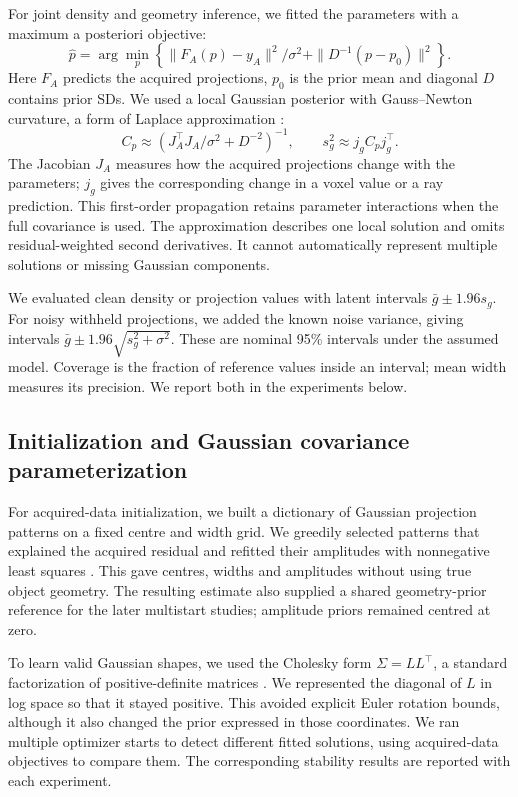 \documentclass[11pt,a4paper]{article}
\begin{document}
For joint density and geometry inference, we fitted the parameters with a maximum a posteriori objective:
\begin{equation}
\hat p=\arg\min_p\left\{\|F_A(p)-y_A\|^2/\sigma^2+\|D^{-1}(p-p_0)\|^2\right\}.
\end{equation}
Here $F_A$ predicts the acquired projections, $p_0$ is the prior mean and diagonal $D$ contains prior SDs. We used a local Gaussian posterior with Gauss--Newton curvature, a form of Laplace approximation \cite{laplace}:
\begin{equation}
C_p\approx\left(J_A^\top J_A/\sigma^2+D^{-2}\right)^{-1},\qquad s_g^2\approx j_g C_p j_g^\top.\label{eq:local}
\end{equation}
The Jacobian $J_A$ measures how the acquired projections change with the parameters; $j_g$ gives the corresponding change in a voxel value or a ray prediction. This first-order propagation retains parameter interactions when the full covariance is used. The approximation describes one local solution and omits residual-weighted second derivatives. It cannot automatically represent multiple solutions or missing Gaussian components.

We evaluated clean density or projection values with latent intervals $\bar g\pm1.96s_g$. For noisy withheld projections, we added the known noise variance, giving intervals $\bar g\pm1.96\sqrt{s_g^2+\sigma^2}$. These are nominal 95\% intervals under the assumed model. Coverage is the fraction of reference values inside an interval; mean width measures its precision. We report both in the experiments below.

\subsection{Initialization and Gaussian covariance parameterization}
For acquired-data initialization, we built a dictionary of Gaussian projection patterns on a fixed centre and width grid. We greedily selected patterns that explained the acquired residual and refitted their amplitudes with nonnegative least squares \cite{lawson}. This gave centres, widths and amplitudes without using true object geometry. The resulting estimate also supplied a shared geometry-prior reference for the later multistart studies; amplitude priors remained centred at zero.

To learn valid Gaussian shapes, we used the Cholesky form $\Sigma=LL^\top$, a standard factorization of positive-definite matrices \cite{golub}. We represented the diagonal of $L$ in log space so that it stayed positive. This avoided explicit Euler rotation bounds, although it also changed the prior expressed in those coordinates. We ran multiple optimizer starts to detect different fitted solutions, using acquired-data objectives to compare them. The corresponding stability results are reported with each experiment.
\FloatBarrier
\end{document}
